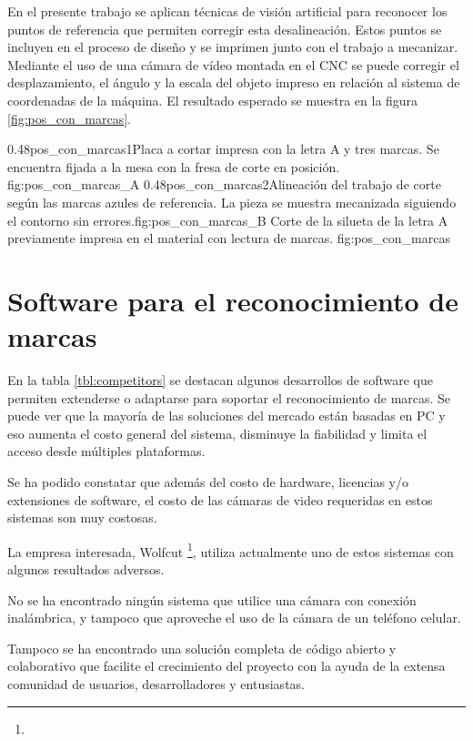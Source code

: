          En el presente trabajo se aplican técnicas de visión artificial para reconocer los puntos de referencia que permiten corregir esta desalineación.
         Estos puntos se incluyen en el proceso de diseño y se imprimen junto con el trabajo a mecanizar.
         Mediante el uso de una cámara de vídeo montada en el CNC se puede corregir el desplazamiento, el ángulo y la escala del objeto impreso en relación al sistema de coordenadas de la máquina.
         El resultado esperado se muestra en la figura \ref{fig:pos_con_marcas}.

\subfigab
         {0.48}{pos_con_marcas1}{Placa a cortar impresa con la letra A y tres marcas. Se encuentra fijada a la mesa con la fresa de corte en posición.\\ \vphantom{10}}{fig:pos_con_marcas_A}
         {0.48}{pos_con_marcas2}{Alineación del trabajo de corte según las marcas azules de referencia. La pieza se muestra mecanizada siguiendo el contorno sin errores.}{fig:pos_con_marcas_B}
         {Corte de la silueta de la letra A previamente impresa en el material con lectura de marcas. }
         {fig:pos_con_marcas}


\section{Software para el reconocimiento de marcas}
   En la tabla \ref{tbl:competitors} se destacan algunos desarrollos de software que permiten extenderse o adaptarse para soportar el reconocimiento de marcas.
   Se puede ver que la mayoría de las soluciones del mercado están basadas en PC y eso aumenta el costo general del sistema, disminuye la fiabilidad y limita el acceso desde múltiples plataformas.\par
   Se ha podido constatar que además del costo de hardware, licencias y/o extensiones de software, el costo de las cámaras de video requeridas en estos sistemas son muy costosas.\par
   La empresa interesada, Wolfcut \footnote{\wolfcutlink}, utiliza actualmente uno de estos sistemas con algunos resultados adversos.\par
   No se ha encontrado ningún sistema que utilice una cámara con conexión inalámbrica, y tampoco que aproveche el uso de la cámara de un teléfono celular.\par
   Tampoco se ha encontrado una solución completa de código abierto y colaborativo que facilite el crecimiento del proyecto con la ayuda de la extensa comunidad de usuarios, desarrolladores y entusiastas.

